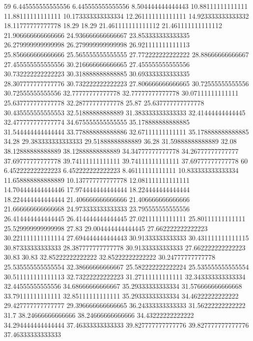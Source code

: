 59 6.445555555555556 6.445555555555556 8.504444444444443 10.88111111111111 11.88111111111111 10.173333333333334 12.261111111111111 14.923333333333332 18.11777777777778 18.29 18.29 21.461111111111112 21.461111111111112 21.906666666666666 24.936666666666667 23.853333333333335 26.279999999999998 26.279999999999998 26.921111111111113 25.856666666666666 25.565555555555555 27.772222222222222 28.88666666666667 27.455555555555556 30.216666666666665 27.455555555555556 30.732222222222223 30.318888888888885 30.693333333333335 28.307777777777776 30.732222222222223 27.806666666666665 30.72555555555556 30.72555555555556 32.77777777777778 32.77777777777778 30.07111111111111 25.637777777777778 32.28777777777778 25.87 25.637777777777778 30.435555555555553 32.51888888888889 31.383333333333333 32.41444444444445 32.477777777777774 34.675555555555555 35.178888888888885 31.544444444444444 33.778888888888886 32.67111111111111 35.178888888888885 34.28 29.383333333333333 29.51888888888889 36.28 31.59888888888889 32.08 38.12888888888889 38.12888888888889 34.34777777777778 34.26777777777777 37.69777777777778 39.74111111111111 39.74111111111111 37.69777777777778
60 6.452222222222223 6.452222222222223 8.46111111111111 10.833333333333334 11.658888888888889 10.137777777777778 12.081111111111111 14.704444444444446 17.974444444444444 18.224444444444444 18.224444444444444 21.406666666666666 21.406666666666666 21.666666666666668 24.973333333333333 23.795555555555556 26.414444444444445 26.414444444444445 27.02111111111111 25.80111111111111 25.529999999999998 27.83 29.004444444444445 27.662222222222223 30.221111111111114 27.694444444444443 30.91333333333333 30.431111111111115 30.87333333333333 28.387777777777778 30.91333333333333 27.662222222222223 30.83 30.83 32.85222222222222 32.85222222222222 30.24777777777778 25.535555555555554 32.38666666666667 25.582222222222224 25.535555555555554 30.511111111111113 32.73222222222223 31.27111111111111 32.343333333333334 32.44555555555556 34.68666666666667 35.29333333333334 31.576666666666668 33.79111111111111 32.85111111111111 35.29333333333334 34.46222222222222 29.427777777777777 29.396666666666665 36.24333333333333 31.56222222222222 31.7 38.24666666666666 38.24666666666666 34.43222222222222 34.294444444444444 37.46333333333333 39.827777777777776 39.827777777777776 37.46333333333333
